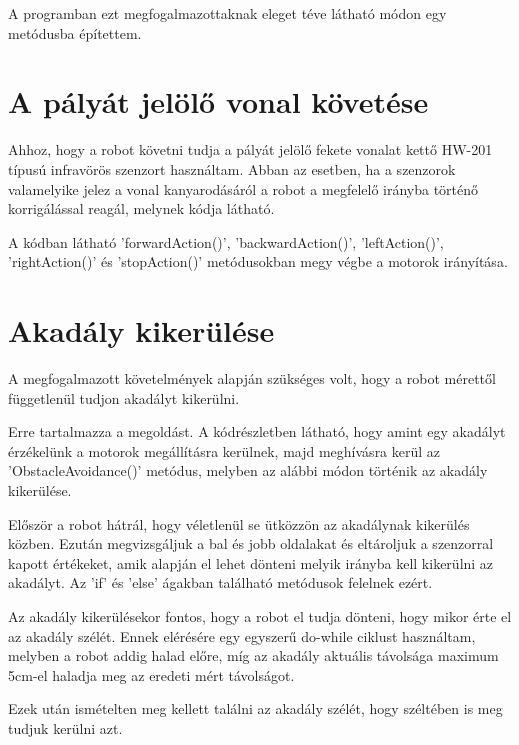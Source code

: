 \documentclass[]{thesis-ekf}
\theoremstyle{definition}
\begin{document}
A programban ezt  megfogalmazottaknak eleget téve  látható módon egy metódusba építettem.

\section{A pályát jelölő vonal követése}


Ahhoz, hogy a robot követni tudja a pályát jelölő fekete vonalat kettő HW-201 típusú infravörös szenzort használtam. Abban az esetben, ha a szenzorok valamelyike jelez a vonal kanyarodásáról a robot a megfelelő irányba történő korrigálással reagál, melynek kódja  látható.

A kódban látható 'forwardAction()', 'backwardAction()', 'leftAction()', 'rightAction()' és 'stopAction()' metódusokban megy végbe a motorok irányítása.
\section{Akadály kikerülése}
A megfogalmazott követelmények alapján szükséges volt, hogy a robot mérettől függetlenül tudjon akadályt kikerülni.

Erre  tartalmazza a megoldást. A kódrészletben látható, hogy amint egy akadályt érzékelünk a motorok megállításra kerülnek, majd meghívásra kerül az 'ObstacleAvoidance()' metódus, melyben az alábbi módon történik az akadály kikerülése.


Először a robot hátrál, hogy véletlenül se ütközzön az akadálynak kikerülés közben. Ezután megvizsgáljuk a bal és jobb oldalakat és eltároljuk a szenzorral kapott értékeket, amik alapján el lehet dönteni melyik irányba kell kikerülni az akadályt. Az 'if' és 'else' ágakban található metódusok felelnek ezért.

Az akadály kikerülésekor fontos, hogy a robot el tudja dönteni, hogy mikor érte el az akadály szélét. Ennek elérésére egy egyszerű do-while ciklust használtam, melyben a robot addig halad előre, míg az akadály aktuális távolsága maximum 5cm-el haladja meg az eredeti mért távolságot.

Ezek után ismételten meg kellett találni az akadály szélét, hogy széltében is meg tudjuk kerülni azt.
\end{document}
